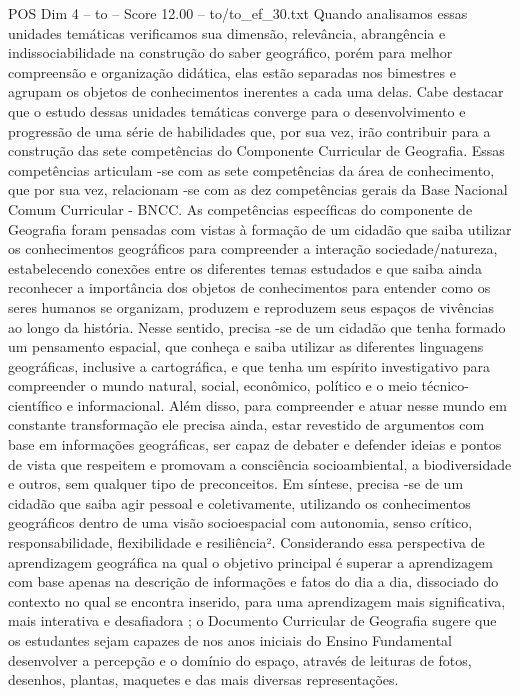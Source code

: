 \begin{textsample}{POS Dim 4 – to – Score 12.00 – to/to\_ef\_30.txt}
Quando analisamos essas unidades temáticas verificamos sua dimensão, relevância, abrangência e indissociabilidade na construção do saber geográfico, porém para melhor compreensão e organização didática, elas estão separadas nos bimestres e agrupam os objetos de conhecimentos inerentes a cada uma delas.
Cabe destacar que o estudo dessas unidades temáticas converge para o desenvolvimento e progressão de uma série de habilidades que, por sua vez, irão contribuir para a construção das sete competências do Componente Curricular de Geografia.
Essas competências articulam -se com as sete competências da área de conhecimento, que por sua vez, relacionam -se com as dez competências gerais da Base Nacional Comum Curricular - BNCC.
As competências específicas do componente de Geografia foram pensadas com vistas à formação de um cidadão que saiba utilizar os conhecimentos geográficos para compreender a interação sociedade/natureza, estabelecendo conexões entre os diferentes temas estudados e que saiba ainda reconhecer a importância dos objetos de conhecimentos para entender como os seres humanos se organizam, produzem e reproduzem seus espaços de vivências ao longo da história.
Nesse sentido, precisa -se de um cidadão que tenha formado um pensamento espacial, que conheça e saiba utilizar as diferentes linguagens geográficas, inclusive a cartográfica, e que tenha um espírito investigativo para compreender o mundo natural, social, econômico, político e o meio técnico-científico e informacional.
Além disso, para compreender e atuar nesse mundo em constante transformação ele precisa ainda, estar revestido de argumentos com base em informações geográficas, ser capaz de debater e defender ideias e pontos de vista que respeitem e promovam a consciência socioambiental, a biodiversidade e outros, sem qualquer tipo de preconceitos.
Em síntese, precisa -se de um cidadão que saiba agir pessoal e coletivamente, utilizando os conhecimentos geográficos dentro de uma visão socioespacial com autonomia, senso crítico, responsabilidade, flexibilidade e resiliência².
Considerando essa perspectiva de aprendizagem geográfica na qual o objetivo principal é superar a aprendizagem com base apenas na descrição de informações e fatos do dia a dia, dissociado do contexto no qual se encontra inserido, para uma aprendizagem mais significativa, mais interativa e desafiadora ; o Documento Curricular de Geografia sugere que os estudantes sejam capazes de nos anos iniciais do Ensino Fundamental desenvolver a percepção e o domínio do espaço, através de leituras de fotos, desenhos, plantas, maquetes e das mais diversas representações.

\end{textsample}
